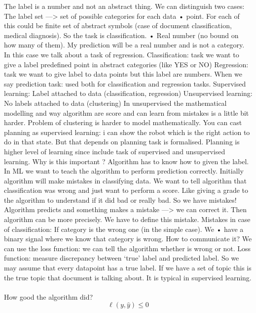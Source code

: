\documentclass[../main.tex]{subfiles}
\begin{document}
The label is a number and not an abstract thing.
We can distinguish two cases:
The label set —> set of possible categories for each data • point. For each of
this could be finite set of abstract symbols (case of document classification,
medical diagnosis). So the task is classification.
• Real number (no bound on how many of them). My prediction will be a real
number and is not a category. In this case we talk about a task of
regression.
Classification: task we want to give a label predefined point in abstract
categories (like YES or NO)
Regression: task we want to give label to data points but this label are
numbers.
When we say prediction task: used both for classification and regression
tasks.
Supervised learning: Label attached to data (classification, regression)
Unsupervised learning: No labels attached to data (clustering)
In unsupervised the mathematical modelling and way algorithm are score and
can learn from mistakes is a little bit harder. Problem of clustering is harder to
model mathematically.
You can cast planning as supervised learning: i can show the robot which is
the right action to do in that state. But that depends on planning task is
formalised.
Planning is higher level of learning since include task of supervised and
unsupervised learning.
Why is this important ?
Algorithm has to know how to given the label.
In ML we want to teach the algorithm to perform prediction correctly. Initially
algorithm will make mistakes in classifying data. We want to tell algorithm that
classification was wrong and just want to perform a score. Like giving a grade
to the algorithm to understand if it did bad or really bad.
So we have mistakes!
Algorithm predicts and something makes a mistake —> we can correct it.
Then algorithm can be more precisely.
We have to define this mistake.
Mistakes in case of classification:
If category is the wrong one (in the simple case). We • have a binary signal
where we know that category is wrong.
How to communicate it?
We can use the loss function: we can tell the algorithm whether is wrong or
not.
Loss function: measure discrepancy between ‘true’ label and predicted
label.
So we may assume that every datapoint has a true label.
If we have a set of topic this is the true topic that document is talking about.
It is typical in supervised learning.
\\\\
How good the algorithm did?
\\

\[\ell(y,\hat{y})\leq0 \]
\end{document}
